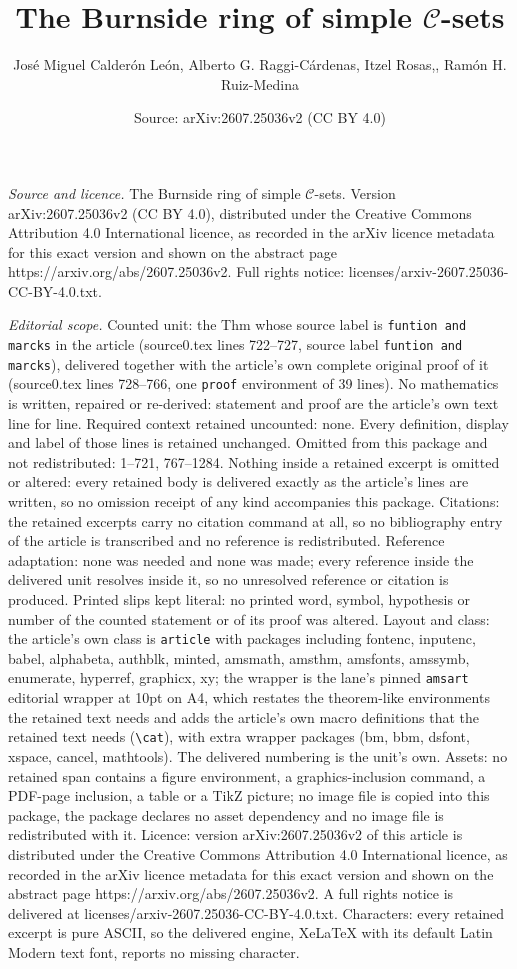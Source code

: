 \documentclass[10pt,a4paper]{amsart}
\title[The Burnside ring of simple $\mathcal{C}$-sets]{The Burnside ring of simple $\mathcal{C}$-sets}
\author{Jos\'e Miguel Calder\'on Le\'on, Alberto G. Raggi-C\'ardenas, Itzel Rosas,, Ram\'on H. Ruiz-Medina}
\date{Source: arXiv:2607.25036v2 (CC BY 4.0)}
\begin{document}
\maketitle

\noindent\emph{Source and licence.} The Burnside ring of simple $\mathcal{C}$-sets. Version arXiv:2607.25036v2 (CC BY 4.0), distributed under the Creative Commons Attribution 4.0 International licence, as recorded in the arXiv licence metadata for this exact version and shown on the abstract page https://arxiv.org/abs/2607.25036v2. Full rights notice: licenses/arxiv-2607.25036-CC-BY-4.0.txt.\par\smallskip

\noindent\textit{Editorial scope.} Counted unit: the Thm whose source label is \texttt{funtion and marcks} in the article (source0.tex lines 722--727, source label \texttt{funtion and marcks}), delivered together with the article's own complete original proof of it (source0.tex lines 728--766, one \texttt{proof} environment of 39 lines). No mathematics is written, repaired or re-derived: statement and proof are the article's own text line for line. Required context retained uncounted: none. Every definition, display and label of those lines is retained unchanged. Omitted from this package and not redistributed: 1--721, 767--1284. Nothing inside a retained excerpt is omitted or altered: every retained body is delivered exactly as the article's lines are written, so no omission receipt of any kind accompanies this package. Citations: the retained excerpts carry no citation command at all, so no bibliography entry of the article is transcribed and no reference is redistributed. Reference adaptation: none was needed and none was made; every reference inside the delivered unit resolves inside it, so no unresolved reference or citation is produced. Printed slips kept literal: no printed word, symbol, hypothesis or number of the counted statement or of its proof was altered. Layout and class: the article's own class is \texttt{article} with packages including fontenc, inputenc, babel, alphabeta, authblk, minted, amsmath, amsthm, amsfonts, amssymb, enumerate, hyperref, graphicx, xy; the wrapper is the lane's pinned \texttt{amsart} editorial wrapper at 10pt on A4, which restates the theorem-like environments the retained text needs and adds the article's own macro definitions that the retained text needs (\texttt{\textbackslash cat}), with extra wrapper packages (bm, bbm, dsfont, xspace, cancel, mathtools). The delivered numbering is the unit's own. Assets: no retained span contains a figure environment, a graphics-inclusion command, a PDF-page inclusion, a table or a TikZ picture; no image file is copied into this package, the package declares no asset dependency and no image file is redistributed with it. Licence: version arXiv:2607.25036v2 of this article is distributed under the Creative Commons Attribution 4.0 International licence, as recorded in the arXiv licence metadata for this exact version and shown on the abstract page https://arxiv.org/abs/2607.25036v2. A full rights notice is delivered at licenses/arxiv-2607.25036-CC-BY-4.0.txt. Characters: every retained excerpt is pure ASCII, so the delivered engine, XeLaTeX with its default Latin Modern text font, reports no missing character.
\end{document}
